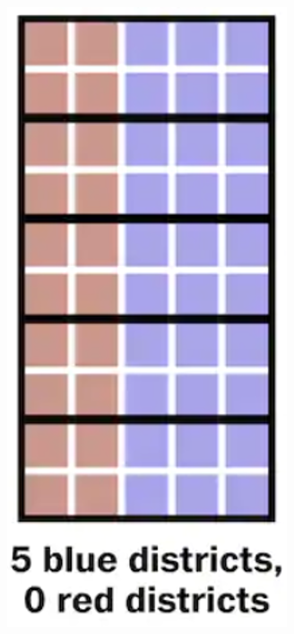 \documentclass[red]{beamer}
\begin{document}
\begin{frame} [t]
\begin{columns}
\begin{column}{0.35\textwidth}
    \end{column}
    \begin{column}{0.35\textwidth}
    \includegraphics[scale = .5]{cracking.png}
    \end{column}
    \begin{column}{0.35\textwidth}

\end{column}
\end{columns}
\end{frame}
\end{document}
